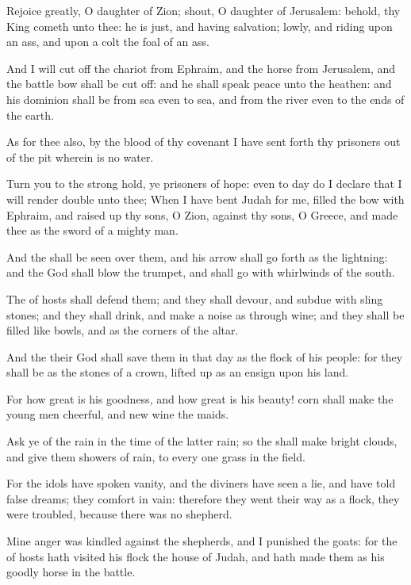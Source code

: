\Verse Rejoice greatly, O daughter of Zion; shout, O daughter of Jerusalem: behold, thy King cometh unto thee: he is just, and having salvation; lowly, and riding upon an ass, and upon a colt the foal of an ass.

\Verse And I will cut off the chariot from Ephraim, and the horse from Jerusalem, and the battle bow shall be cut off: and he shall speak peace unto the heathen: and his dominion shall be from sea even to sea, and from the river even to the ends of the earth.

\Verse As for thee also, by the blood of thy covenant I have sent forth thy prisoners out of the pit wherein is no water.

\Verse Turn you to the strong hold, ye prisoners of hope: even to day do I declare that I will render double unto thee; \Verse When I have bent Judah for me, filled the bow with Ephraim, and raised up thy sons, O Zion, against thy sons, O Greece, and made thee as the sword of a mighty man.

\Verse And the \LORD shall be seen over them, and his arrow shall go forth as the lightning: and the \LORD God shall blow the trumpet, and shall go with whirlwinds of the south.

\Verse The \LORD of hosts shall defend them; and they shall devour, and subdue with sling stones; and they shall drink, and make a noise as through wine; and they shall be filled like bowls, and as the corners of the altar.

\Verse And the \LORD their God shall save them in that day as the flock of his people: for they shall be as the stones of a crown, lifted up as an ensign upon his land.

\Verse For how great is his goodness, and how great is his beauty! corn shall make the young men cheerful, and new wine the maids.


\Chapter
\Verse Ask ye of the \LORD rain in the time of the latter rain; so the \LORD shall make bright clouds, and give them showers of rain, to every one grass in the field.

\Verse For the idols have spoken vanity, and the diviners have seen a lie, and have told false dreams; they comfort in vain: therefore they went their way as a flock, they were troubled, because there was no shepherd.

\Verse Mine anger was kindled against the shepherds, and I punished the goats: for the \LORD of hosts hath visited his flock the house of Judah, and hath made them as his goodly horse in the battle.

